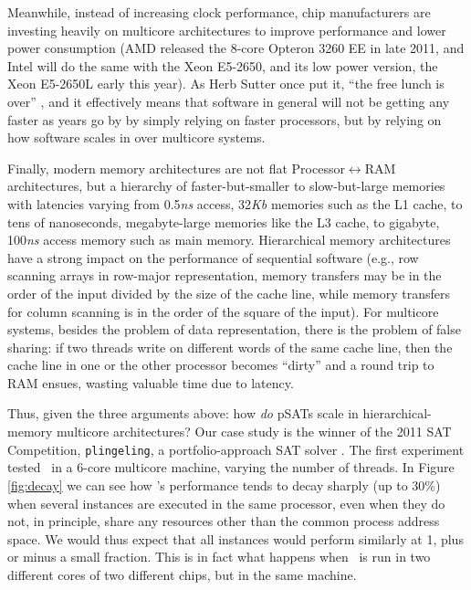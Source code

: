 \documentclass{llncs}
\begin{document}
Meanwhile, instead of increasing clock performance, chip manufacturers
are investing heavily on multicore architectures to improve
performance and lower power consumption (AMD released the 8-core
Opteron 3260 EE in late 2011, and Intel will do the same with the Xeon
E5-2650, and its low power version, the Xeon E5-2650L early this
year). As Herb Sutter once put it, ``the free lunch is over''
\cite{FreeLunchIsOver}, and it effectively means that software in
general will not be getting any faster as years go by by simply
relying on faster processors, but by relying on how software scales in
over multicore systems.

Finally, modern memory architectures are not flat
Processor$\leftrightarrow$RAM architectures, but a hierarchy of
faster-but-smaller to slow-but-large memories with latencies varying
from 0.5{\it ns} access, 32{\it Kb} memories such as the L1 cache, to
tens of nanoseconds, megabyte-large memories like the L3 cache, to
gigabyte, 100{\it ns} access memory such as main memory. Hierarchical
memory architectures have a strong impact on the performance of
sequential software (e.g., row scanning arrays in row-major
representation, memory transfers may be in the order of the input
divided by the size of the cache line, while memory transfers for
column scanning is in the order of the square of the input). For
multicore systems, besides the problem of data representation, there
is the problem of false sharing: if two threads write on different
words of the same cache line, then the cache line in one or the other
processor becomes ``dirty'' and a round trip to RAM ensues, wasting
valuable time due to latency.

Thus, given the three arguments above: how {\em do} pSATs scale in
hierarchical-memory multicore architectures? Our case study is the
winner of the 2011 SAT Competition, {\tt plingeling}, a
portfolio-approach SAT solver \cite{lingeling}. The first experiment
tested \pling\ in a 6-core multicore machine, varying the number of
threads. In Figure \ref{fig:decay} we can see how \pling's performance
tends to decay sharply (up to 30\%) when several instances are
executed in the same processor, even when they do not, in principle,
share any resources other than the common process address space. We
would thus expect that all instances would perform similarly at 1,
plus or minus a small fraction. This is in fact what happens when
\pling\ is run in two different cores of two different chips, but in
the same machine.
\end{document}
